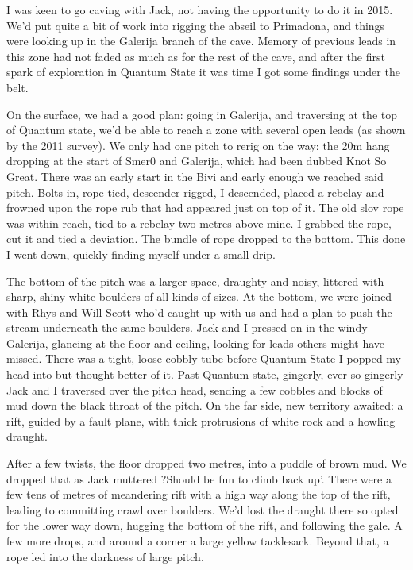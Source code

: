 I was keen to go caving with Jack, not having the opportunity to do it in 2015. We'd put quite a bit of work into rigging the abseil to Primadona, and things were looking up in the Galerija branch of the cave. Memory of previous leads in this zone had not faded as much as for the rest of the cave, and after the first spark of exploration in Quantum State it was time I got some findings under the belt.

On the surface, we had a good plan: going in Galerija, and traversing at the top of Quantum state, we'd be able to reach a zone with several open leads (as shown by the 2011 survey). We only had one pitch to rerig on the way: the 20m hang dropping at the start of Smer0 and Galerija, which had been dubbed Knot So Great. There was an early start in the Bivi and early enough we reached said pitch. Bolts in, rope tied, descender rigged, I descended, placed a rebelay and frowned upon the rope rub that had appeared just on top of it. The old slov rope was within reach, tied to a rebelay two metres above mine. I grabbed the rope, cut it and tied a deviation. The bundle of rope dropped to the bottom. This done I went down, quickly finding myself under a small drip. 

The bottom of the pitch was a larger space, draughty and noisy, littered with sharp, shiny white boulders of all kinds of sizes. At the bottom, we were joined with Rhys and Will Scott who'd caught up with us and had a plan to push the stream underneath the same boulders. Jack and I pressed on in the windy Galerija, glancing at the floor and ceiling, looking for leads others might have missed. There was a tight, loose cobbly tube before Quantum State I popped my head into but thought better of it. Past Quantum state, gingerly, ever so gingerly Jack and I traversed over the pitch head, sending a few cobbles and blocks of mud down the black throat of the pitch. On the far side, new territory awaited: a rift, guided by a fault plane, with thick protrusions of white rock and a howling draught.

After a few twists, the floor dropped two metres, into a puddle of brown mud. We dropped that as Jack muttered ?Should be fun to climb back up'. There were a few tens of metres of meandering rift with a high way along the top of the rift, leading to committing crawl over boulders. We'd lost the draught there so opted for the lower way down, hugging the bottom of the rift, and following the gale. A few more drops, and around a corner a large yellow tacklesack. Beyond that, a rope led into the darkness of large pitch.

